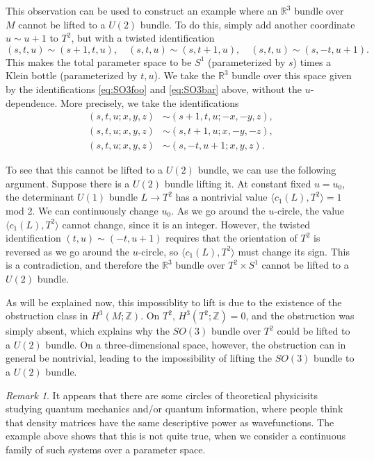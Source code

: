 \documentclass[12pt]{article}
\numberwithin{equation}{section}
\numberwithin{figure}{section}
\theoremstyle{remark}
\newtheorem{remark}[definition]{Remark}
\def\bR{\mathbb{R}}
\def\bZ{\mathbb{Z}}
\begin{document}
This observation can be used to construct an example
where an $\bR^3$ bundle over $M$ cannot be lifted to a $U(2)$ bundle.
To do this, simply add another coordinate $u\sim u+1$ to $T^2$,
but with a twisted identification \begin{equation}
(s,t,u) \sim (s+1,t,u),\quad
(s,t,u) \sim (s,t+1,u),\quad
(s,t,u) \sim (s,-t,u+1).
\end{equation}
This makes the total parameter space to be $S^1$ (parameterized by $s$)
times a Klein bottle (parameterized by $t,u$).
We take the $\bR^3$ bundle over this space given by the identifications \eqref{eq:SO3foo} and \eqref{eq:SO3bar} above,
without the $u$-dependence. More precisely, we take the identifications \begin{align}
  (s,t,u;x,y,z) &\sim (s+1,t,u;-x,-y,z),\\
  (s,t,u;x,y,z) &\sim (s,t+1,u;x,-y,-z),\\
  (s,t,u;x,y,z) &\sim (s,-t,u+1;x,y,z).
\end{align}

To see that this cannot be lifted to a $U(2)$ bundle, we can use the following argument.
Suppose there is a $U(2)$ bundle lifting it.
At constant fixed $u=u_0$, the determinant $U(1)$ bundle $L\to T^2$
has a nontrivial value $\langle c_1(L),T^2\rangle = 1 $ mod 2.
We can continuously change $u_0$.
As we go around the $u$-circle, the value $ \langle c_1(L),T^2\rangle$
cannot change, since it is an integer.
However, the twisted identification $(t,u)\sim (-t,u+1)$
requires that the orientation of $T^2$ is reversed as we go around the $u$-circle,
so $\langle c_1(L),T^2\rangle$ must change its sign.
This is a contradiction, and therefore the $\bR^3$ bundle over $T^2\times S^1$ cannot be lifted to a $U(2)$ bundle.

As will be explained now, this impossiblity to lift is 
due to the existence of the obstruction class in $H^3(M;\bZ)$.
On $T^2$, $H^3(T^2;\bZ)=0$, and the obstruction was simply absent,
which explains why the $SO(3)$ bundle over $T^2$ could be lifted to a $U(2)$ bundle.
On a three-dimensional space, however, the obstruction can in general be nontrivial,
leading to the impossibility of lifting the $SO(3)$ bundle to a $U(2)$ bundle.

\begin{remark}
It appears that there are some circles of theoretical physicisits studying 
quantum mechanics and/or quantum information,
where people think that density matrices have 
the same descriptive power as wavefunctions.
The example above shows that this is not quite true,
when we consider a continuous family of such systems over a parameter space.
\end{remark}
\fi
\end{document}
